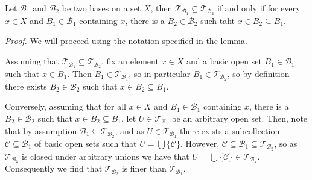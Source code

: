 \documentclass[12pt, a4paper, oneside, openright, titlepage]{book}
\begin{document}
\begin{lem}
    Let $\mathcal{B}_1$ and $\mathcal{B}_2$ be two bases on a set $X$, then $\mathcal{T}_{\mathcal{B}_1} \subseteq \mathcal{T}_{\mathcal{B}_2}$ if and only if for every $x \in X$ and $B_1 \in \mathcal{B}_1$ containing $x$, there is a $B_2 \in \mathcal{B}_2$ such taht $x \in B_2 \subseteq B_1$.
\end{lem}
\begin{proof}
    We will proceed using the notation specified in the lemma.

    Assuming that $\mathcal{T}_{\mathcal{B}_1}\subseteq \mathcal{T}_{\mathcal{B}_2}$, fix an element $x \in X$ and a basic open set $B_1 \in \mathcal{B}_1$ such that $x \in B_1$. Then $B_1 \in \mathcal{T}_{\mathcal{B}_1}$, so in particular $B_1 \in \mathcal{T}_{\mathcal{B}_2}$, so by definition there exists $B_2 \in \mathcal{B}_2$ such that $x \in B_2 \subseteq B_1$.


    Conversely, assuming that for all $x \in X$ and $B_1 \in \mathcal{B}_1$ containing $x$, there is a $B_2 \in \mathcal{B}_2$ such that $x \in B_2 \subseteq B_1$, let $U \in \mathcal{T}_{\mathcal{B}_1}$ be an arbitrary open set. Then, note that by assumption $\mathcal{B}_1 \subseteq \mathcal{T}_{\mathcal{B}_2}$, and as $U \in \mathcal{T}_{\mathcal{B}_1}$ there exists a subcollection $\mathcal{C} \subseteq \mathcal{B}_1$ of basic open sets such that $U = \bigcup\{\mathcal{C}\}$. However, $\mathcal{C} \subseteq \mathcal{B}_1\subseteq\mathcal{T}_{\mathcal{B}_2}$, so as $\mathcal{T}_{\mathcal{B}_2}$ is closed under arbitrary unions we have that $U =\bigcup\{\mathcal{C}\} \in \mathcal{T}_{\mathcal{B}_2}$. Consequently we find that $\mathcal{T}_{\mathcal{B}_2}$ is finer than $\mathcal{T}_{\mathcal{B}_1}$.
\end{proof}
\end{document}
